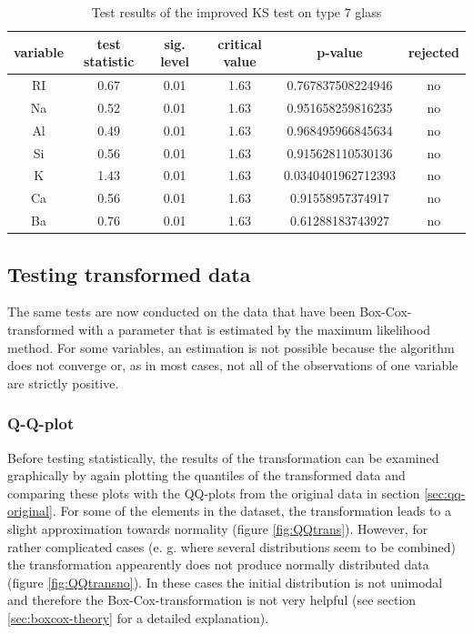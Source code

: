 \documentclass[a4paper, 12pt, titlepage, headsepline, listof = totoc, bibliography = totoc, numbers = noenddot]{scrartcl}
\begin{document}
\begin{table}[h!]
\centering
\begin{tabular}{|cccccc|} \hline variable & test statistic & sig. level & critical value & p-value & rejected\\ \hline RI & 0.67 & 0.01 & 1.63 & 0.767837508224946 & no\\ 
Na & 0.52 & 0.01 & 1.63 & 0.951658259816235 & no\\ 
Al & 0.49 & 0.01 & 1.63 & 0.968495966845634 & no\\ 
Si & 0.56 & 0.01 & 1.63 & 0.915628110530136 & no\\ 
K & 1.43 & 0.01 & 1.63 & 0.0340401962712393 & no\\ 
Ca & 0.56 & 0.01 & 1.63 & 0.91558957374917 & no\\ 
Ba & 0.76 & 0.01 & 1.63 & 0.61288183743927 & no\\ \hline \end{tabular}\caption{Test results of the improved KS test on type 7 glass}
\label{tab:KS-type7}
\end{table}

\subsection{Testing transformed data}\label{sec:testing-transformed-data}

The same tests are now conducted on the data that have been Box-Cox-transformed with a parameter that is estimated by the maximum likelihood method. For some variables, an estimation is not possible because the algorithm does not converge or, as in most cases, not all of the observations of one variable are strictly positive.
\subsubsection{Q-Q-plot}\label{sec:qq-transformed}

Before testing statistically, the results of the transformation can be examined graphically by again plotting the quantiles of the transformed data and comparing these plots with the QQ-plots from the original data in section \ref{sec:qq-original}. For some of the elements in the dataset, the transformation leads to a slight approximation towards normality (figure \ref{fig:QQtrans}). However, for rather complicated cases (e. g. where several distributions seem to be combined) the transformation appearently does not produce normally distributed data (figure \ref{fig:QQtransno}). In these cases the initial distribution is not unimodal and therefore the Box-Cox-transformation is not very helpful (see section \ref{sec:boxcox-theory} for a detailed explanation).
\end{document}
